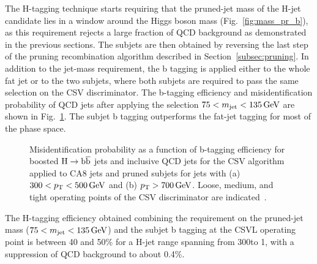 The H-tagging technique starts requiring that the pruned-jet mass of the H-jet candidate lies in a window around the Higgs boson mass (Fig.~\ref{fig:mass_pr_b}),
as this requirement rejects a large fraction of QCD background as demonstrated in the previous sections.
The subjets are then obtained by reversing the last step of the pruning recombination algorithm described in Section~\ref{subsec:pruning}.
In addition to the jet-mass requirement, the b tagging is applied either to the whole fat jet or to the two subjets, where both subjets are required
to pass the same selection on the CSV discriminator. The b-tagging efficiency and misidentification probability of QCD jets after applying the selection $75 < m_{\text{jet}} < 135\,\text{Ge\hspace{-.08em}V}$ are shown in Fig.~\ref{fig:htagging8TeV}.
The subjet b tagging outperforms the fat-jet tagging for most of the phase space.

\begin{figure}[!htb]
\centering     %
{}
 \caption{Misidentification probability as a function of b-tagging efficiency for boosted $\mathrm{H}\to{\mathrm{b}\overline{\mathrm{b}}}$ jets and inclusive QCD jets for the CSV algorithm applied to CA8 jets
 and pruned subjets for jets with (a) $300 < p_{\mathrm{T}} < 500\,\text{Ge\hspace{-.08em}V}$ and (b) $p_{\mathrm{T}} > 700\,\text{Ge\hspace{-.08em}V}$. Loose, medium, and tight operating points of the CSV discriminator are indicated~\cite{CMS:BTV13001}.}
\label{fig:htagging8TeV}
\end{figure}

The H-tagging efficiency obtained combining the requirement on the pruned-jet mass ($75 < m_{\text{jet}} < 135\,\text{Ge\hspace{-.08em}V}$)
and the subjet b tagging at the CSVL operating point is between 40 and 50\% for a H-jet \pt range spanning from 300\GeV to 1\TeV,
with a suppression of QCD background to about 0.4\%.\\

